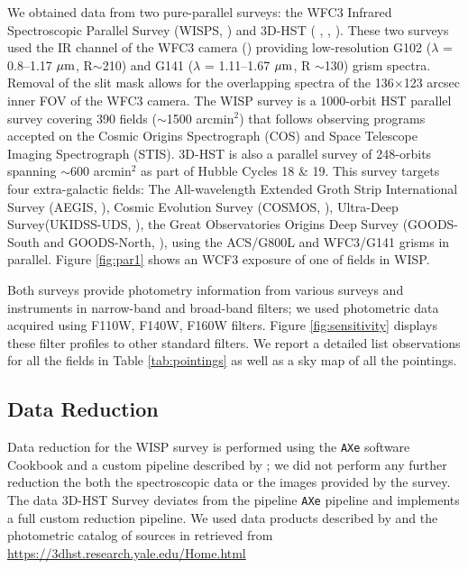 \documentclass[manuscript]{aastex}
\begin{document}
We obtained data from two pure-parallel surveys: the WFC3 Infrared Spectroscopic Parallel Survey (WISPS, \citealt{2010ApJ...723..104A}) and 3D-HST ( \citealt{Momcheva2016}, \citealt{2012ApJS..200...13B}, \citealt{Skelton2014}). These two surveys used the IR channel of the WFC3 camera (\citealt{doi:10.1117/12.789581}) providing low-resolution G102 ($\lambda$ = 0.8--1.17 $\mbox{$\mu$m}$, R$\sim$210) and G141 ($\lambda$ = 1.11--1.67 $\mbox{$\mu$m}$, R $\sim$130) grism spectra. Removal of the slit mask allows for the overlapping spectra of the 136$\times$123 arcsec inner FOV of the WFC3 camera.
The WISP survey is a 1000-orbit HST parallel survey covering 390 fields ($\sim$1500 arcmin$^2$) that follows observing programs accepted on the Cosmic Origins Spectrograph (COS) and Space Telescope Imaging Spectrograph (STIS). 3D-HST is also a parallel survey of 248-orbits spanning $\sim$600 arcmin$^2$ as part of Hubble Cycles 18 \& 19. This survey targets four extra-galactic fields: The All-wavelength Extended Groth Strip International Survey (AEGIS, \citealt{1538-4357-660-1-L1} ), Cosmic Evolution Survey (COSMOS, \citealt{Scoville2007}), Ultra-Deep Survey(UKIDSS-UDS, \citealt{2007MNRAS.379.1599L}), the Great Observatories Origins Deep Survey (GOODS-South and GOODS-North, \citealt{Giavalisco2004}), using the ACS/G800L and WFC3/G141 grisms in parallel. Figure \ref{fig:par1} shows an WCF3 exposure of one of fields in WISP.

Both surveys provide photometry information from various surveys and instruments in narrow-band and broad-band filters; we used photometric data acquired using F110W, F140W, F160W filters. Figure \ref{fig:sensitivity} disp{}lays these filter profiles to other standard filters. We report a detailed list observations for all the fields in Table \ref{tab:pointings} as well as a sky map of all the pointings.

\subsection{Data Reduction}

Data reduction for the WISP survey is performed using the \texttt{AXe} software Cookbook \citep{Kuntschner2013, Kummel2009} and a custom pipeline described by \cite{2010ApJ...723..104A}; we did not perform any further reduction the both the spectroscopic data or the images provided by the survey. The data 3D-HST Survey deviates from the pipeline \texttt{AXe} pipeline and implements a full custom reduction pipeline. We used data products described by \cite{Momcheva2016} and the photometric catalog of sources in \cite{Skelton2014} retrieved from \url{https://3dhst.research.yale.edu/Home.html}
\end{document}
